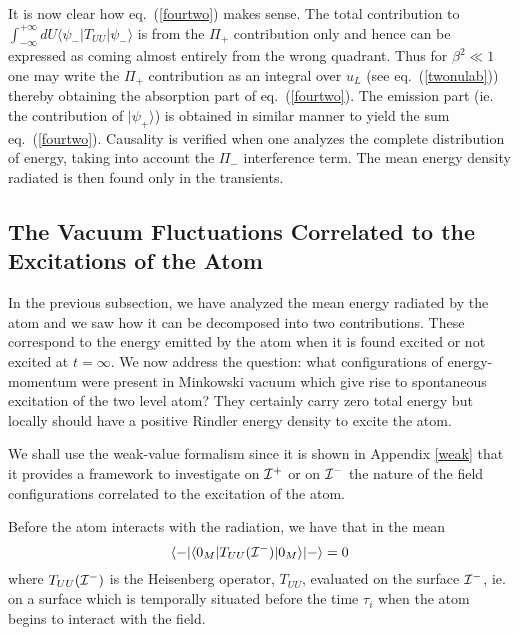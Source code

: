 \documentclass[12pt,oneside]{report}
\def\ket#1{|#1\rangle}
\def\bra#1{\langle #1|}
\def\elematrice#1#2#3{\langle #1|#2|#3 \rangle}
\begin{document}
It is now clear how eq.~(\ref{fourtwo}) makes sense. The total contribution to 
$\int_{-\infty}^{+\infty} \! dU  \elematrice{\psi_-} { T_{UU} }{\psi_-}$
is from the $\Pi_+$ contribution only
and hence can be expressed as coming
almost entirely from
the wrong quadrant. 
Thus for $\beta^2 \ll1$ one may write the $\Pi_+$ contribution as an integral
over $u_L$ (see eq.~(\ref{twonulab})) thereby obtaining 
the absorption part
of eq.~(\ref{fourtwo}). The emission part (ie. the contribution of
$\ket{\psi_+}$) is obtained in similar manner to yield the sum
eq.~(\ref{fourtwo}). Causality is verified when one analyzes the complete
distribution of energy, taking into account the $\Pi_-$ interference term. The
mean energy density radiated is then found only in the transients.



\subsection{The Vacuum Fluctuations Correlated to the Excitations of the Atom}
\label{weakacc}

In the previous subsection, we have analyzed the mean energy radiated by the
atom and we saw how it can be decomposed into two contributions. These
correspond to the energy emitted by the atom when it is found  excited or not
excited at $t=\infty$. We now address the
question: what configurations of energy-momentum 
were
present in Minkowski vacuum which
give rise to spontaneous excitation of the two level atom? 
They certainly carry zero
total energy but locally should
have a positive Rindler energy density to excite the
atom.

We shall use the weak-value formalism since
it is shown in Appendix \ref{weak} that it
provides a framework 
to investigate on ${\cal{I^+}}$ or on ${\cal{I^-}}$ 
the nature of the field configurations
correlated to the excitation of the atom.

Before the atom interacts with the radiation, we have that in the mean
\begin{equation}
\bra{-} \elematrice{0_M}{T_{UU}({\cal{I^-}})}{0_M } \ket{-}=0
\end{equation}
where 
$T_{UU}({\cal{I^-}})$ is the Heisenberg operator, $T_{UU}$, evaluated on the surface
${\cal I}^-$, ie. on a surface which is temporally situated before the time $\tau_i$
when the atom begins to interact with the field. 
\end{document}
